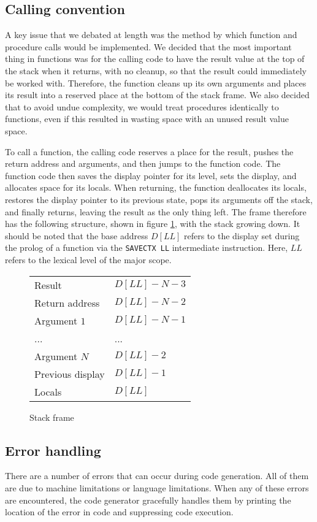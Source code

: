 \documentclass[oneside]{amsart}
\theoremstyle{definition}
\theoremstyle{remark}
\numberwithin{equation}{section}
\begin{document}
\subsection{Calling convention}
A key issue that we debated at length was the method by which function and procedure calls would be
implemented. We decided that the most important thing in functions was for the calling code  to have
the result value at the top of the stack when it returns, with no cleanup, so that the result could
immediately be worked with. Therefore, the function cleans up its own arguments and places its
result into a reserved place at the bottom of the stack frame. We also decided that to avoid undue
complexity, we would treat procedures identically to functions, even if this resulted in wasting
space with an unused result value space.

To call a function, the calling code reserves a place for the result, pushes the return address and
arguments, and then jumps to the function code. The function code then saves the display pointer for
its level, sets the display, and allocates space for its locals. When returning, the function
deallocates its locals, restores the display pointer to its previous state, pops its arguments off
the stack, and finally returns, leaving the result as the only thing left. The frame therefore has
the following structure, shown in figure \ref{fig:frame}, with the stack growing down. It should be
noted that the base address $D[LL]$ refers to the display set during the prolog of a function via
the \texttt{SAVECTX LL} intermediate instruction. Here, $LL$ refers to the lexical level of the
major scope.

\begin{figure}[h]
\caption{Stack frame}
\begin{tabular}{l|l}
Result & $D[LL] - N - 3$ \\
Return address & $D[LL] - N - 2$  \\
Argument $1$ & $D[LL] - N - 1$  \\
... & ... \\
Argument $N$ & $D[LL] - 2$ \\
Previous display & $D[LL] - 1$ \\
Locals & $D[LL]$
\end{tabular}
\label{fig:frame}
\end{figure}

\subsection{Error handling}
There are a number of errors that can occur during code generation. All of them are due to machine
limitations or language limitations. When any of these errors are encountered, the code generator
gracefully handles them by printing the location of the error in code and suppressing code
execution.
\end{document}
